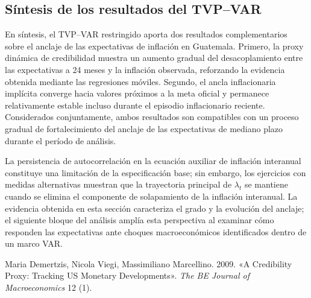 \documentclass[
  spanish,
  letterpaper,
  DIV=11,
  numbers=noendperiod]{scrartcl}
\newlength{\cslhangindent}
\newenvironment{CSLReferences}[2] %
 {\begin{list}{}{%
  \setlength{\itemindent}{0pt}
  \setlength{\leftmargin}{0pt}
  \setlength{\parsep}{0pt}
  \ifodd #1
   \setlength{\leftmargin}{\cslhangindent}
   \setlength{\itemindent}{-1\cslhangindent}
  \fi
  \setlength{\itemsep}{#2\baselineskip}}}
 {\end{list}}
\begin{document}
\subsection{Síntesis de los resultados del
TVP--VAR}\label{suxedntesis-de-los-resultados-del-tvpvar}

En síntesis, el TVP--VAR restringido aporta dos resultados
complementarios sobre el anclaje de las expectativas de inflación en
Guatemala. Primero, la proxy dinámica de credibilidad muestra un aumento
gradual del desacoplamiento entre las expectativas a 24 meses y la
inflación observada, reforzando la evidencia obtenida mediante las
regresiones móviles. Segundo, el ancla inflacionaria implícita converge
hacia valores próximos a la meta oficial y permanece relativamente
estable incluso durante el episodio inflacionario reciente. Considerados
conjuntamente, ambos resultados son compatibles con un proceso gradual
de fortalecimiento del anclaje de las expectativas de mediano plazo
durante el período de análisis.

La persistencia de autocorrelación en la ecuación auxiliar de inflación
interanual constituye una limitación de la especificación base; sin
embargo, los ejercicios con medidas alternativas muestran que la
trayectoria principal de \(\lambda_t\) se mantiene cuando se elimina el
componente de solapamiento de la inflación interanual. La evidencia
obtenida en esta sección caracteriza el grado y la evolución del
anclaje; el siguiente bloque del análisis amplía esta perspectiva al
examinar cómo responden las expectativas ante choques macroeconómicos
identificados dentro de un marco VAR.

\label{refs}
\begin{CSLReferences}{1}{0}
Maria Demertzis, Nicola Viegi, Massimiliano Marcellino. 2009. {«A
Credibility Proxy: Tracking US Monetary Developments»}. \emph{The BE
Journal of Macroeconomics} 12 (1).

\end{CSLReferences}
\end{document}
